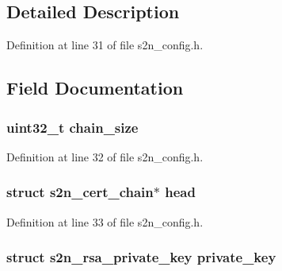 \subsection{Detailed Description}


Definition at line 31 of file s2n\+\_\+config.\+h.



\subsection{Field Documentation}
\subsubsection[{\texorpdfstring{chain\+\_\+size}{chain_size}}]{\setlength{\rightskip}{0pt plus 5cm}uint32\+\_\+t chain\+\_\+size}\hypertarget{structs2n__cert__chain__and__key_af6903d14cb3f4627a8cfe70d368b1413}{}\label{structs2n__cert__chain__and__key_af6903d14cb3f4627a8cfe70d368b1413}


Definition at line 32 of file s2n\+\_\+config.\+h.

\subsubsection[{\texorpdfstring{head}{head}}]{\setlength{\rightskip}{0pt plus 5cm}struct {\bf s2n\+\_\+cert\+\_\+chain}$\ast$ head}\hypertarget{structs2n__cert__chain__and__key_a006e23cea0adf1733edba58ea15cd7ed}{}\label{structs2n__cert__chain__and__key_a006e23cea0adf1733edba58ea15cd7ed}


Definition at line 33 of file s2n\+\_\+config.\+h.

\subsubsection[{\texorpdfstring{private\+\_\+key}{private_key}}]{\setlength{\rightskip}{0pt plus 5cm}struct {\bf s2n\+\_\+rsa\+\_\+private\+\_\+key} private\+\_\+key}\hypertarget{structs2n__cert__chain__and__key_a849e4c18d4d5c98a2ae6eb3c1983e060}{}\label{structs2n__cert__chain__and__key_a849e4c18d4d5c98a2ae6eb3c1983e060}


